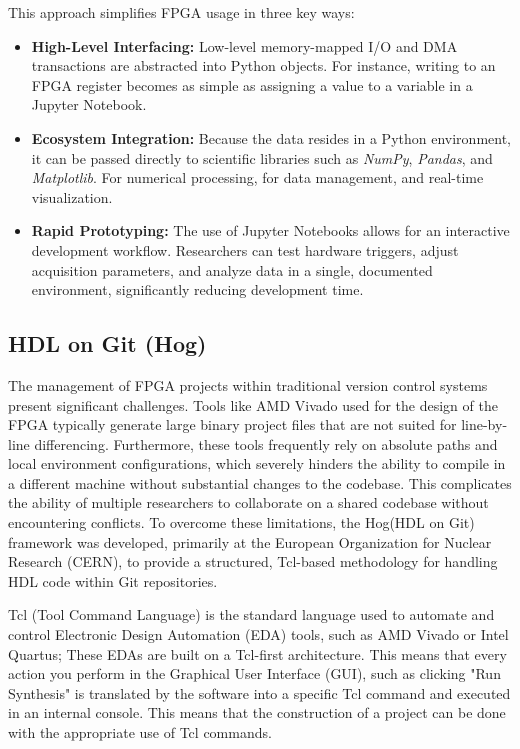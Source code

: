 This approach simplifies FPGA usage in three key ways:
\begin{itemize}
\item \textbf{High-Level Interfacing:} Low-level memory-mapped I/O and DMA transactions are abstracted into Python objects. For instance, writing to an FPGA register becomes as simple as assigning a value to a variable in a Jupyter Notebook.
\item \textbf{Ecosystem Integration:} Because the data resides in a Python environment, it can be passed directly to scientific libraries such as \textit{NumPy}, \textit{Pandas}, and \textit{Matplotlib}. For numerical processing, for data management, and real-time visualization.
\item \textbf{Rapid Prototyping:} The use of Jupyter Notebooks allows for an interactive development workflow. Researchers can test hardware triggers, adjust acquisition parameters, and analyze data in a single, documented environment, significantly reducing development time.
\end{itemize}

\subsection{HDL on Git (Hog)}
The management of FPGA projects within traditional version control systems present significant challenges. Tools like AMD Vivado used for the design of the FPGA typically generate large binary project files that are not suited for line-by-line differencing. Furthermore, these tools frequently rely on absolute paths and local environment configurations, which severely hinders the ability to compile in a different machine without substantial changes to the codebase. This complicates the ability of multiple researchers to collaborate on a shared codebase without encountering conflicts. To overcome these limitations, the Hog(HDL on Git) framework \cite{HogHogGitLab2026} was developed, primarily at the European Organization for Nuclear Research (CERN), to provide a structured, Tcl-based methodology for handling HDL code within Git repositories. 

Tcl (Tool Command Language) is the standard language used to automate and control Electronic Design Automation (EDA) tools, such as AMD Vivado or Intel Quartus; These EDAs are built on a Tcl-first architecture. This means that every action you perform in the Graphical User Interface (GUI), such as clicking "Run Synthesis" is translated by the software into a specific Tcl command and executed in an internal console. This means that the construction of a project can be done with the appropriate use of Tcl commands.



